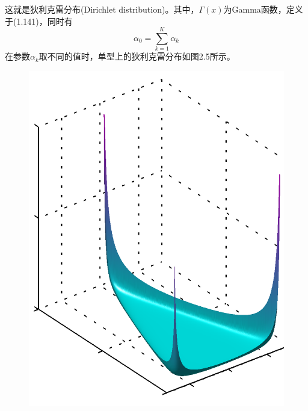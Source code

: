 \documentclass[b5paper]{book}
\numberwithin{equation}{chapter}
\begin{document}
{\begin{equation}
	\end{equation}
	这就是狄利克雷分布(Dirichlet distribution)。其中，$\Gamma(x)$为Gamma函数，定义于(1.141)，同时有
	\begin{equation}
		\alpha_0 = \sum_{k=1}^K \alpha_k
	\end{equation}
	在参数$\alpha_k$取不同的值时，单型上的狄利克雷分布如图2.5所示。
	\begin{figure}[ht]
	\centering
		\begin{minipage}[t]{0.3\linewidth}
		\centering
		\includegraphics[scale=0.8]{Images/2-5a.png}
		\label{fig:2-5a}
		\end{minipage}
		\begin{minipage}[t]{0.3\linewidth}
		\centering

\end{minipage}
\end{figure}}
\end{document}
